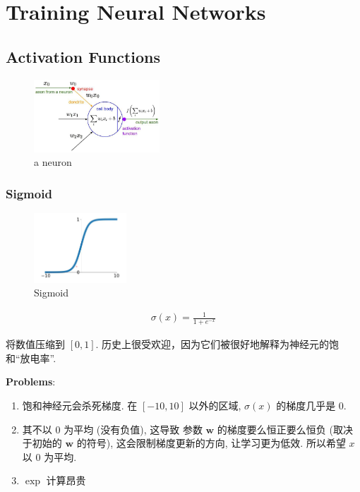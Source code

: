\newpage
\section{Training Neural Networks}

\subsection{Activation Functions}

\begin{figure}[!htb]
    \centering
    \includegraphics[width=0.42\textwidth]{pic/Lec6/a neuron}
    \caption{a neuron}
\end{figure}


\subsubsection{Sigmoid}
\begin{figure}[!htb]
    \centering
    \includegraphics[width=0.309\textwidth]{pic/Lec6/Sigmoid.png}
    \caption{Sigmoid}
\end{figure}

\begin{align*}
    \sigma(x)=\frac{1}{1+e^{-x}}
\end{align*}

将数值压缩到 $[0,1]$. 历史上很受欢迎，因为它们被很好地解释为神经元的饱和``放电率''. 

\textbf{Problems}:
\begin{enumerate}
    \item 饱和神经元会杀死梯度. 在 $[-10,10]$ 以外的区域, $\sigma(x)$ 的梯度几乎是 $0$. 
    \item 其不以 $0$ 为平均 (没有负值), 这导致 参数 $\mathbf{w}$ 的梯度要么恒正要么恒负 (取决于初始的 $\mathbf{w}$ 的符号), 这会限制梯度更新的方向, 让学习更为低效. 所以希望 $x$ 以 $0$ 为平均. 
    \item $\exp$ 计算昂贵 
\end{enumerate}

